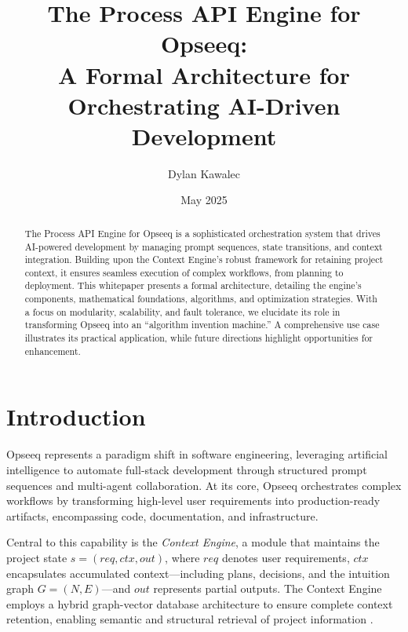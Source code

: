 \documentclass[11pt,a4paper]{article}
\title{The Process API Engine for Opseeq:\\A Formal Architecture for Orchestrating AI-Driven Development}
\author{Dylan Kawalec}
\date{May 2025}
\begin{document}
\maketitle

\begin{abstract}
The Process API Engine for Opseeq is a sophisticated orchestration system that drives AI-powered development by managing prompt sequences, state transitions, and context integration. Building upon the Context Engine’s robust framework for retaining project context, it ensures seamless execution of complex workflows, from planning to deployment. This whitepaper presents a formal architecture, detailing the engine’s components, mathematical foundations, algorithms, and optimization strategies. With a focus on modularity, scalability, and fault tolerance, we elucidate its role in transforming Opseeq into an ``algorithm invention machine.'' A comprehensive use case illustrates its practical application, while future directions highlight opportunities for enhancement.
\end{abstract}

\section{Introduction}
\label{sec:introduction}

Opseeq represents a paradigm shift in software engineering, leveraging artificial intelligence to automate full-stack development through structured prompt sequences and multi-agent collaboration. At its core, Opseeq orchestrates complex workflows by transforming high-level user requirements into production-ready artifacts, encompassing code, documentation, and infrastructure.

Central to this capability is the \emph{Context Engine}, a module that maintains the project state \( s = (req, ctx, out) \), where \( req \) denotes user requirements, \( ctx \) encapsulates accumulated context—including plans, decisions, and the intuition graph \( G = (N, E) \)—and \( out \) represents partial outputs. The Context Engine employs a hybrid graph-vector database architecture to ensure complete context retention, enabling semantic and structural retrieval of project information \cite{opseeq_research}.
\end{document}
